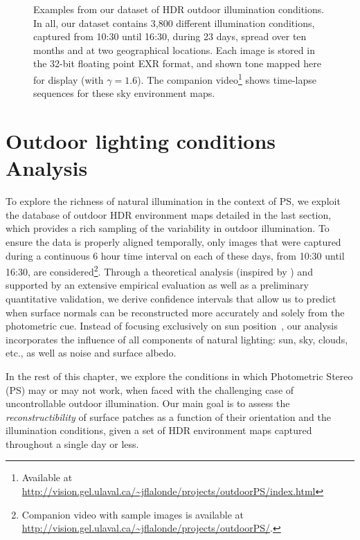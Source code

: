 \begin{figure}
\begin{tabular}{@{}rcccccccccccc@{}}
    \\

    \end{tabular}
    \caption[HDRDB dataset excerpt]{Examples from our dataset of HDR outdoor illumination conditions. In all, our dataset contains 3,800 different illumination conditions, captured from 10{:}30 until 16{:}30, during 23 days, spread over ten months and at two geographical locations. Each image is stored in the 32-bit floating point EXR format, and shown tone mapped here for display (with $\gamma = 1.6$). The companion video\footnote{Available at \url{http://vision.gel.ulaval.ca/~jflalonde/projects/outdoorPS/index.html}} shows time-lapse sequences for these sky environment maps.}
    \label{fig:database}
\end{figure}

\section{Outdoor lighting conditions Analysis}


To explore the richness of natural illumination in the context of PS, we exploit the database of outdoor HDR environment maps detailed in the last section, which provides a rich sampling of the variability in outdoor illumination. To ensure the data is properly aligned temporally, only images that were captured during a continuous 6 hour time interval on each of these days, from 10{:}30 until 16{:}30, are considered\footnote{Companion video with sample images is available at \url{http://vision.gel.ulaval.ca/~jflalonde/projects/outdoorPS/}.}. Through a theoretical analysis (inspired by \cite{sun-ivc-07}) and supported by an extensive empirical evaluation as well as a preliminary quantitative validation, we derive confidence intervals that allow us to predict when surface normals can be reconstructed more accurately and solely from the photometric cue. Instead of focusing exclusively on sun position~\cite{shen-pg-14}, our analysis incorporates the influence of all components of natural lighting: sun, sky, clouds, etc., as well as noise and surface albedo.

In the rest of this chapter, we explore the conditions in which Photometric Stereo (PS) may or may not work, when faced with the challenging case of uncontrollable outdoor illumination. Our main goal is to assess the \emph{reconstructibility} of surface patches as a function of their orientation and the illumination conditions, given a set of HDR environment maps captured throughout a single day or less.

